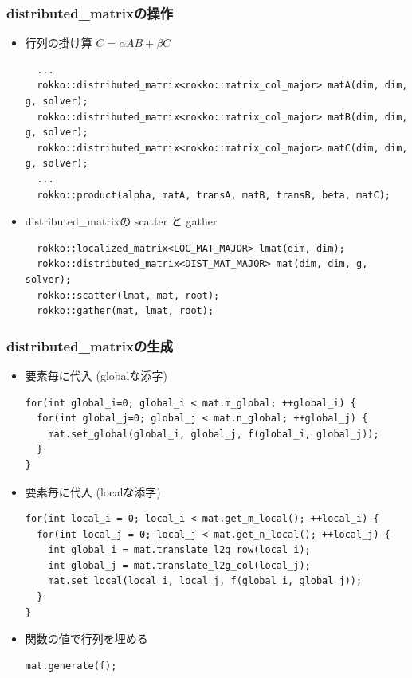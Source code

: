 \begin{frame}[c,fragile]
  \frametitle{distributed\_matrixの操作}
  \begin{itemize}
  \item 行列の掛け算 $C = \alpha A B + \beta C$
\begin{lstlisting}
  ...
  rokko::distributed_matrix<rokko::matrix_col_major> matA(dim, dim, g, solver);
  rokko::distributed_matrix<rokko::matrix_col_major> matB(dim, dim, g, solver);
  rokko::distributed_matrix<rokko::matrix_col_major> matC(dim, dim, g, solver);
  ...
  rokko::product(alpha, matA, transA, matB, transB, beta, matC);
\end{lstlisting}
  \item distributed\_matrixの scatter と gather
\begin{lstlisting}
  rokko::localized_matrix<LOC_MAT_MAJOR> lmat(dim, dim);
  rokko::distributed_matrix<DIST_MAT_MAJOR> mat(dim, dim, g, solver);
  rokko::scatter(lmat, mat, root);
  rokko::gather(mat, lmat, root);
\end{lstlisting}
  \end{itemize}
\end{frame}

\begin{frame}[c,fragile]
  \frametitle{distributed\_matrixの生成}
  \begin{itemize}
  \item 要素毎に代入 (globalな添字)
\begin{lstlisting}
for(int global_i=0; global_i < mat.m_global; ++global_i) {
  for(int global_j=0; global_j < mat.n_global; ++global_j) {
    mat.set_global(global_i, global_j, f(global_i, global_j));
  }
}
\end{lstlisting}
  \item 要素毎に代入 (localな添字)
\begin{lstlisting}
for(int local_i = 0; local_i < mat.get_m_local(); ++local_i) {
  for(int local_j = 0; local_j < mat.get_n_local(); ++local_j) {
    int global_i = mat.translate_l2g_row(local_i);
    int global_j = mat.translate_l2g_col(local_j);
    mat.set_local(local_i, local_j, f(global_i, global_j));
  }
}
\end{lstlisting}
  \item 関数の値で行列を埋める
\begin{lstlisting}
mat.generate(f);
\end{lstlisting}
  \end{itemize}
\end{frame}

